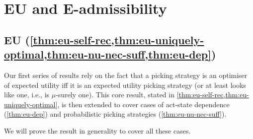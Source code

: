 \documentclass[a4paper]{article}
\newtheorem{theorem}{Theorem}
\newcommand\A{\mathcal{A}}
\newcommand\Exp{\mathsf{Exp}}
\newcommand\EU{\mathrm{EU}}
\newcommand\U{\mathfrak{U}} %
\newcommand{\D}{\mathcal{D}}
\newcommand{\n}{\mathsf{n}}
\renewcommand{\nu}{\n}
\renewcommand{\color}[1]{}
\newenvironment{colored}[1]{\leavevmode\color{#1}}{}
\DeclarePairedDelimiter\abs{\lvert}{\rvert}%
\newcommand*\diff{\mathop{}\!\mathrm{d}}
\renewcommand{\leq}{\leqslant}
\renewcommand{\geq}{\geqslant}
\newenvironment{CCM rewritten}
{\begingroup\color{blue}} %
{\endgroup}              %
\begin{document}
\begin{colored}{violet}
\section{EU and E-admissibility}

	
\subsection{EU (\cref{thm:eu-self-rec,thm:eu-uniquely-optimal,thm:eu-nu-nec-suff,thm:eu-dep})}
Our first series of results rely on the fact that a picking strategy is an optimiser of expected utility iff it is an expected utility picking strategy (or at least looks like one, i.e., is $\mu$-surely one). This core result, stated in \cref{thm:eu-self-rec,thm:eu-uniquely-optimal}, is then extended to cover cases of act-state dependence (\cref{thm:eu-dep}) and probabilistic picking strategies (\cref{thm:eu-nu-nec-suff}). 

We will prove the result in generality to cover all these cases. 

%
%	
%	
%
%


\end{colored}
\end{document}
